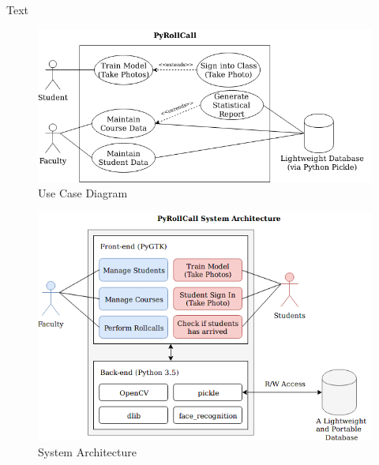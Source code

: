 Text

\begin{figure}[!htb]
  \centering
  \includegraphics[width=\linewidth]{figures/use-case.png}
  \caption{Use Case Diagram}
  \label{fig:implementation}
\end{figure}

\begin{figure}[!htb]
  \centering
  \includegraphics[width=\linewidth]{figures/system-architecture.png}
  \caption{System Architecture}
  \label{fig:implementation}
\end{figure}
